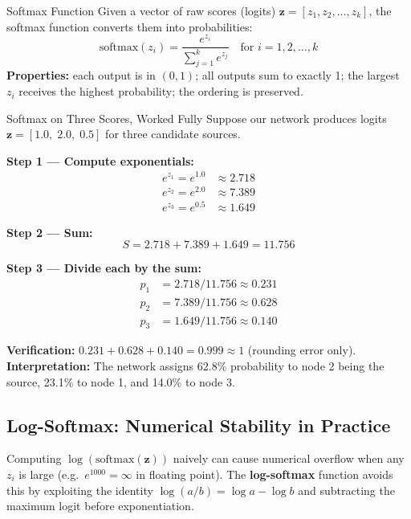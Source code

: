 \begin{mathbox}{Softmax Function}
Given a vector of raw scores (logits) $\mathbf{z} = [z_1, z_2, \ldots, z_k]$, the softmax function converts them into probabilities:
\begin{equation}
    \text{softmax}(z_i) = \frac{e^{z_i}}{\displaystyle\sum_{j=1}^{k} e^{z_j}}
    \quad \text{for } i = 1, 2, \ldots, k
\end{equation}
\textbf{Properties:} each output is in $(0,1)$; all outputs sum to exactly 1; the largest $z_i$ receives the highest probability; the ordering is preserved.
\end{mathbox}

\begin{examplebox}{Softmax on Three Scores, Worked Fully}
Suppose our network produces logits $\mathbf{z} = [1.0,\; 2.0,\; 0.5]$ for three candidate sources.

\textbf{Step 1 --- Compute exponentials:}
\begin{align*}
    e^{z_1} = e^{1.0} &\approx 2.718 \\
    e^{z_2} = e^{2.0} &\approx 7.389 \\
    e^{z_3} = e^{0.5} &\approx 1.649
\end{align*}

\textbf{Step 2 --- Sum:}
\[
    S = 2.718 + 7.389 + 1.649 = 11.756
\]

\textbf{Step 3 --- Divide each by the sum:}
\begin{align*}
    p_1 &= 2.718 / 11.756 \approx 0.231 \\
    p_2 &= 7.389 / 11.756 \approx 0.628 \\
    p_3 &= 1.649 / 11.756 \approx 0.140
\end{align*}

\textbf{Verification:} $0.231 + 0.628 + 0.140 = 0.999 \approx 1$ (rounding error only). \\
\textbf{Interpretation:} The network assigns 62.8\% probability to node 2 being the source, 23.1\% to node 1, and 14.0\% to node 3.
\end{examplebox}

\subsection{Log-Softmax: Numerical Stability in Practice}

Computing $\log(\text{softmax}(\mathbf{z}))$ naively can cause numerical overflow when any $z_i$ is large (e.g.\ $e^{1000} = \infty$ in floating point). The \textbf{log-softmax} function avoids this by exploiting the identity $\log(a/b) = \log a - \log b$ and subtracting the maximum logit before exponentiation.

